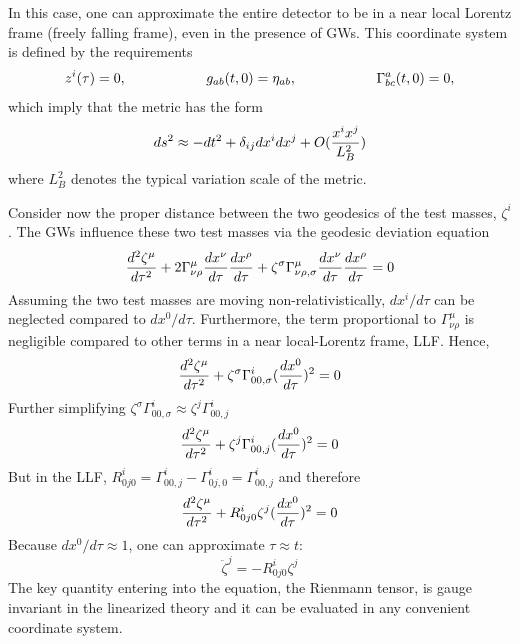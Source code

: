 \documentclass[binding=0.6cm, LaM]{sapthesis}
\begin{document}
        In this case, one can approximate the entire detector to be in a near local Lorentz frame
        (freely falling frame), even in the presence of GWs. This coordinate system is defined by the requirements
        \begin{equation}
          z^i(\tau) = 0, \hspace*{2cm} g_{ab}(t, 0) = \eta_{ab}, \hspace*{2cm} \Gamma^a_{bc}(t,0) = 0,
        \end{equation}
        which imply that the metric has the form
        \begin{equation}
          ds^2 \approx -dt^2 + \delta_{ij}dx^i dx^j + O({{x^ix^j}\over{L^2_B}})
        \end{equation}
        where $L^2_B$ denotes the typical variation scale of the metric.

        Consider now the proper distance between the two geodesics of the test masses, $\zeta^i$.
        The GWs influence these two test masses via the geodesic deviation equation
        \begin{equation}
          {{d^2\zeta^{\mu}}\over{d\tau^2}} + 2\Gamma^{\mu}_{\nu\rho}{{dx^{\nu}}\over{d\tau}}{{dx^\rho}\over{d\tau}} + \zeta^{\sigma}\Gamma^{\mu}_{\nu\rho,\sigma}{{dx^{\nu}}\over{d\tau}}{{dx^{\rho}}\over{d\tau}} = 0
        \end{equation}
        Assuming the two test masses are moving non-relativistically, $dx^i/d\tau$ can be neglected compared to $dx^0/d\tau$.
        Furthermore, the term proportional to $\Gamma^{\mu}_{\nu\rho}$ is negligible compared to other terms in a near  local-Lorentz frame, LLF. Hence,
        \begin{equation}
          {{d^2\zeta^{\mu}}\over{d\tau^2}} + \zeta^{\sigma}\Gamma^{i}_{00, \sigma}({{dx^0}\over{d\tau}})^2 = 0
        \end{equation}
        Further simplifying $\zeta^{\sigma}\Gamma^{i}_{00, \sigma} \approx \zeta^{j}\Gamma^{i}_{00, j}$
        \begin{equation}
          {{d^2\zeta^{\mu}}\over{d\tau^2}} + \zeta^{j}\Gamma^{i}_{00,j}({{dx^0}\over{d\tau}})^2 = 0
        \end{equation}
        But in the LLF, $R^i_{0j0} = \Gamma^i_{00,j} - \Gamma^i_{0j,0} = \Gamma^i_{00,j}$ and therefore
        \begin{equation}
          {{d^2\zeta^{\mu}}\over{d\tau^2}} + R^i_{0j0} \zeta^j({{dx^0}\over{d\tau}})^2 = 0
        \end{equation}
        Because $dx^0/d\tau \approx 1$, one can approximate $\tau \approx t$:
        \begin{equation}
          {\ddot \zeta}^j = - R^i_{0j0}\zeta^j
        \end{equation}
        The key quantity entering into the equation, the Rienmann tensor, is gauge invariant in the linearized theory and
        it can be evaluated in any convenient coordinate system.
\end{document}

